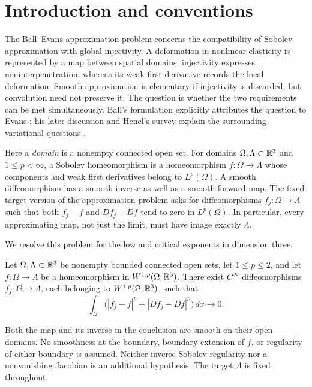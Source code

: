 \section{Introduction and conventions}\label{sec:introduction}

The Ball--Evans approximation problem concerns the compatibility of
Sobolev approximation with global injectivity. A deformation in nonlinear
elasticity is represented by a map between spatial domains; injectivity
expresses noninterpenetration, whereas its weak first derivative records
the local deformation. Smooth approximation is elementary if injectivity
is discarded, but convolution need not preserve it. The question is
whether the two requirements can be met simultaneously. Ball's
formulation explicitly attributes the question to Evans
\cite[Section~3, p.~8]{Ball2001}; his later discussion and Hencl's survey
explain the surrounding variational questions
\cite{Ball2010,Hencl2025}.

Here a \emph{domain} is a nonempty connected open set. For domains
$\Omega,\Lambda\subset\mathbb R^3$ and $1\le p<\infty$, a Sobolev
homeomorphism is a homeomorphism $f:\Omega\to\Lambda$ whose components
and weak first derivatives belong to $L^p(\Omega)$. A smooth
diffeomorphism has a smooth inverse as well as a smooth forward map.
The fixed-target version of the approximation problem asks for
diffeomorphisms $f_j:\Omega\to\Lambda$ such that both $f_j-f$ and
$Df_j-Df$ tend to zero in $L^p(\Omega)$. In particular, every
approximating map, not just the limit, must have image exactly
$\Lambda$.

We resolve this problem for the low and critical exponents in dimension
three.

\begin{theorem}\label{main:theorem}
Let $\Omega,\Lambda\subset\mathbb R^3$ be nonempty bounded connected open sets, let $1\le p\le2$, and let $f:\Omega\to\Lambda$ be a homeomorphism in $W^{1,p}(\Omega;\mathbb R^3)$. There exist $C^\infty$ diffeomorphisms $f_j:\Omega\to\Lambda$, each belonging to $W^{1,p}(\Omega;\mathbb R^3)$, such that
\begin{equation}\label{main:convergence}
\int_\Omega\bigl( |f_j-f|^p+|Df_j-Df|^p\bigr)\,dx\longrightarrow0.
\end{equation}
\end{theorem}

Both the map and its inverse in the conclusion are smooth on their open domains. No smoothness at the boundary, boundary extension of $f$, or regularity of either boundary is assumed. Neither inverse Sobolev regularity nor a nonvanishing Jacobian is an additional hypothesis. The target $\Lambda$ is fixed throughout.

